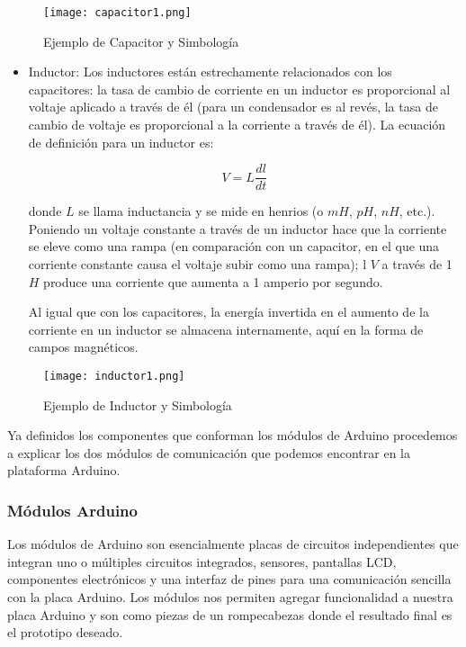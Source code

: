 \begin{figure}[H]
	\centering
	\texttt{[image: capacitor1.png]}
	\caption{Ejemplo de Capacitor y Simbología}
\end{figure}

\begin{itemize}
	\item Inductor: Los inductores están estrechamente relacionados con los capacitores: la tasa de cambio de corriente en un inductor es proporcional al voltaje aplicado a través de él (para un condensador es al revés, la tasa de cambio de voltaje es proporcional a la corriente a través de él).\cite{artofelectronics} La ecuación de definición para un inductor es:
	
	$$V = L\frac{dl}{dt}$$
	
	\par \noindent
	donde $L$ se llama inductancia y se mide en henrios
	(o $mH$, $pH$, $nH$, etc.). Poniendo un voltaje constante a través de un
	inductor hace que la corriente se eleve como una rampa (en comparación con un capacitor, en el que una corriente constante causa el voltaje subir como una rampa); l $V$ a través de 1 $H$ produce una corriente que aumenta a 1 amperio por segundo.
	
	\par \noindent
	Al igual que con los capacitores, la energía invertida en el aumento de la corriente en un inductor se almacena internamente, aquí en la forma de campos magnéticos.\cite{artofelectronics}
	
\end{itemize}

\begin{figure}[H]
	\centering
	\texttt{[image: inductor1.png]}
	\caption{Ejemplo de Inductor y Simbología}
\end{figure}

\par \noindent
Ya definidos los componentes que conforman los módulos de Arduino procedemos a explicar los dos módulos de comunicación que podemos encontrar en la plataforma Arduino.

\subsubsection{Módulos Arduino}

\par
Los módulos de Arduino son esencialmente placas de circuitos independientes que integran uno o múltiples circuitos integrados, sensores, pantallas LCD, componentes electrónicos y una interfaz de pines para una comunicación sencilla con la placa Arduino. Los módulos nos permiten agregar funcionalidad a nuestra placa Arduino y son como piezas de un rompecabezas donde el resultado final es el prototipo deseado.

